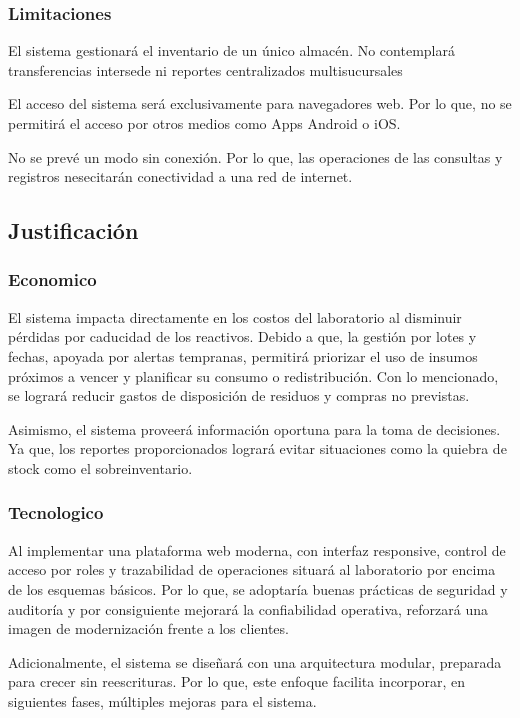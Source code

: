 \documentclass[12pt]{article} %
\begin{document}
\subsubsection{Limitaciones}

El sistema gestionará el inventario de un único almacén. No contemplará transferencias intersede ni reportes centralizados multisucursales

El acceso del sistema será exclusivamente para navegadores web. Por lo que, no se permitirá el acceso por otros medios como Apps Android o iOS.

No se prevé un modo sin conexión. Por lo que, las operaciones de las consultas y registros nesecitarán conectividad a una red de internet.

\subsection{Justificación}

\subsubsection{Economico}

El sistema impacta directamente en los costos del laboratorio al disminuir pérdidas por caducidad de los reactivos. Debido a que, la gestión por lotes y fechas, apoyada por alertas tempranas, permitirá priorizar el uso de insumos próximos a vencer y planificar su consumo o redistribución. Con lo mencionado, se logrará reducir gastos de disposición de residuos y compras no previstas.

Asimismo, el sistema proveerá información oportuna para la toma de decisiones. Ya que, los reportes proporcionados logrará evitar situaciones como la quiebra de stock como el sobreinventario.

\subsubsection{Tecnologico}

Al implementar una plataforma web moderna, con interfaz responsive, control de acceso por roles y trazabilidad de operaciones situará al laboratorio por encima de los esquemas básicos. Por lo que, se adoptaría buenas prácticas de seguridad y auditoría y por consiguiente mejorará la confiabilidad operativa, reforzará una imagen de modernización frente a los clientes.

Adicionalmente, el sistema se diseñará con una arquitectura modular, preparada para crecer sin reescrituras. Por lo que, este enfoque facilita incorporar, en siguientes fases, múltiples mejoras para el sistema.
\end{document}
